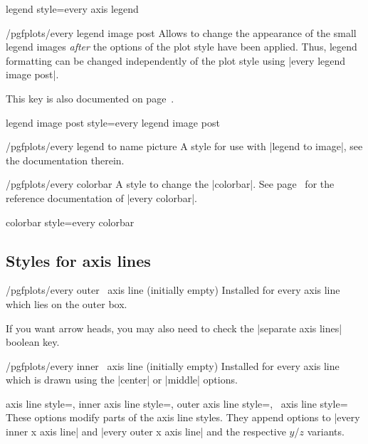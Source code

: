 \pgfplotsshortstylekey legend style=every axis legend\pgfeov

\begin{stylekey}{/pgfplots/every legend image post}
    Allows to change the appearance of the small legend images \emph{after} the
    options of the plot style have been applied. Thus, legend formatting can be
    changed independently of the plot style using |every legend image post|.

    This key is also documented on page~\pageref{key:legendimagepost}.
\end{stylekey}

\pgfplotsshortstylekey legend image post style=every legend image post\pgfeov

\begin{stylekey}{/pgfplots/every legend to name picture}
    A style for use with |legend to image|, see the documentation therein.
\end{stylekey}

\begin{stylekey}{/pgfplots/every colorbar}
    A style to change the |colorbar|. See page~\pageref{key:every:colorbar} for
    the reference documentation of |every colorbar|.
\end{stylekey}

\pgfplotsshortstylekey colorbar style=every colorbar\pgfeov

\subsection*{Styles for axis lines}
\begin{xystylekey}{/pgfplots/every outer \x\ axis line (initially empty)}
    Installed for every axis line which lies on the outer box.

    If you want arrow heads, you may also need to check the
    |separate axis lines| boolean key.
\end{xystylekey}

\begin{xystylekey}{/pgfplots/every inner \x\ axis line (initially empty)}
    Installed for every axis line which is drawn using the |center| or |middle|
    options.
\end{xystylekey}

\begin{pgfplotsxykeylist}{%
    axis line style=,
    inner axis line style=,
    outer axis line style=,
    \x\ axis line style=%
}
    These options modify parts of the axis line styles. They append options to
    |every inner x axis line| and |every outer x axis line| and the respective
    $y$/$z$ variants.
\end{pgfplotsxykeylist}

